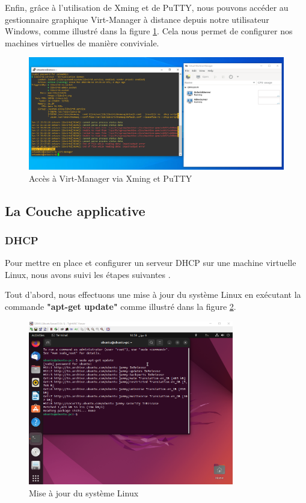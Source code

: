 Enfin, grâce à l'utilisation de Xming et de PuTTY, nous pouvons accéder au gestionnaire graphique Virt-Manager à distance depuis notre utilisateur Windows, comme illustré dans la figure \ref{fig:virt-manager-access}. Cela nous permet de configurer nos machines virtuelles de manière conviviale.

\begin{figure}[H]
 \centering
    \includegraphics[width=15cm]{Images/resultvirtmanager.png}
    \caption{Accès à Virt-Manager via Xming et PuTTY}
    \label{fig:virt-manager-access}
\end{figure}

\subsection{La Couche applicative}

\subsubsection{DHCP}

Pour mettre en place et configurer un serveur DHCP sur une machine virtuelle Linux, nous avons suivi les étapes suivantes \cite{linuxhint_dhcp_server}.

Tout d'abord, nous effectuons une mise à jour du système Linux en exécutant la commande \textbf{"apt-get update"} comme illustré dans la figure \ref{fig:update-linux}.

\begin{figure}[H]
    \centering
    \includegraphics[width=0.8\textwidth]{Images/dhcp1.png}
    \caption{Mise à jour du système Linux}
    \label{fig:update-linux}
\end{figure}


